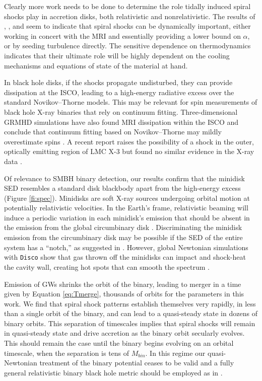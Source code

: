\documentclass{emulateapj}
\newcommand{\al}{\alpha}
\newcommand{\Disco}{{\texttt{Disco}}}
\begin{document}
Clearly more work needs to be done to determine the role tidally induced spiral shocks play in accretion disks, both relativistic and nonrelativistic.  The results of \cite{Ju16}, \cite{Zhu16}, and \cite{Bae16} seem to indicate that spiral shocks can be dynamically important, either working in concert with the MRI and essentially providing a lower bound on $\al$, or by seeding turbulence directly.  The sensitive dependence on thermodynamics indicates that their ultimate role will be highly dependent on the cooling mechanisms and equations of state of the material at hand.

In black hole disks, if the shocks propagate undisturbed, they can provide dissipation at the ISCO, leading to a high-energy radiative excess over the standard Novikov--Thorne models.  This may be relevant for spin measurements of black hole X-ray binaries that rely on continuum fitting. Three-dimensional GRMHD simulations have also found MRI dissipation within the ISCO and conclude that continuum fitting based on Novikov--Thorne may mildly overestimate spins \citep{Penna10, Noble10, Kulkarni11, Schnittman15}.  A recent report raises the possibility of a shock in the outer, optically emitting region of LMC X-3 but found no similar evidence in the X-ray data \citep{Steiner14}.

Of relevance to SMBH binary detection, our results confirm that the minidisk SED resembles a standard disk blackbody apart from the high-energy excess (Figure \ref{fi:spec}).  Minidisks are soft X-ray sources undergoing orbital motion at potentially relativistic velocities.  In the Earth's frame, relativistic beaming will induce a periodic variation in each minidisk's emission that should be absent in the emission from the global circumbinary disk \citep{DOrazio15}.  Discriminating the minidisk emission from the circumbinary disk may be possible if the SED of the entire system has a ``notch,'' as suggested in \cite{Roedig14}.  However, global Newtonian simulations with \Disco{} show that gas thrown off the minidisks can impact and shock-heat the cavity wall, creating hot spots that can smooth the spectrum \citep{Farris15A}.

Emission of GWs shrinks the orbit of the binary, leading to merger in a time given by Equation \eqref{eq:Tmerge}, thousands of orbits for the parameters in this work.  We find that spiral shock patterns establish themselves very rapidly, in less than a single orbit of the binary, and can lead to a quasi-steady state in dozens of binary orbits.  This separation of timescales implies that spiral shocks will remain in quasi-steady state and drive accretion as the binary orbit secularly evolves.  This should remain the case until the binary begins evolving on an orbital timescale, when the separation is tens of $M_{bin}$. In this regime our quasi-Newtonian treatment of the binary potential ceases to be valid and a fully general relativistic binary black hole metric should be employed as in \cite{Farris12,Noble12,Zilhao15}.
\end{document}
